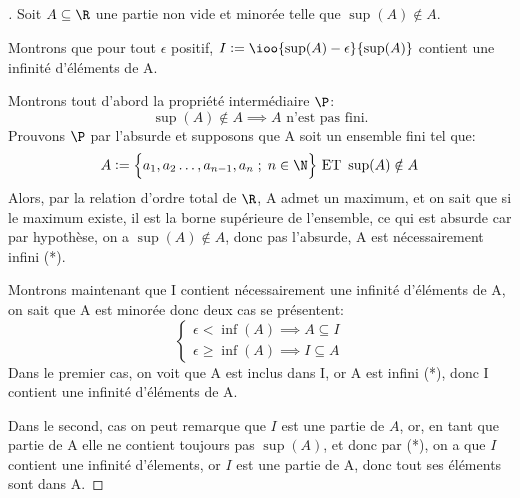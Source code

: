 \subsection[Exercice 13:]{}
\begin{proof}[\unskip\nopunct]
   Soit \(A \subseteq \R\) une partie non vide et minorée telle que \(\sup(A) \notin A\).

   Montrons que pour tout \(\epsilon\) positif, \(I := \ioo{\sup(A) - \epsilon}{\sup(A)}\) contient une infinité d'éléments de A.\<

   Montrons tout d'abord la propriété intermédiaire \(\P\):
   \[
      \sup(A) \notin A \implies A \text{ n'est pas fini.}
   \]
   Prouvons \(\P\) par l'absurde et supposons que A soit un ensemble fini tel que:
   \[
      A := \Bigl\{ a_1, a_2 \ldots, a_{n-1}, a_{n} \; ; \; n \in \N \Bigl\} \text{ ET } \sup(A) \notin A
   \]
   Alors, par la relation d'ordre total de \(\R\), A admet un maximum, et on sait que si le maximum existe, il est la borne supérieure de l'ensemble, ce qui est absurde car par hypothèse, on a \(\sup(A) \notin A\), donc pas l'absurde, A est nécessairement infini (*).\<

   Montrons maintenant que I contient nécessairement une infinité d'éléments de A, on sait que A est minorée donc deux cas se présentent:
   \[
      \begin{cases}
         \epsilon < \inf(A) \implies A \subseteq I\\
         \epsilon \geq \inf(A) \implies I \subseteq A
      \end{cases}
   \]
   Dans le premier cas, on voit que A est inclus dans I, or A est infini (*), donc I contient une infinité d'éléments de A.

   Dans le second, cas on peut remarque que \(I\) est une partie de \(A\), or, en tant que partie de A elle ne contient toujours pas \(\sup(A)\), et donc par (*), on a que \(I\) contient une infinité d'élements, or \(I\) est une partie de A, donc tout ses éléments sont dans A.
\end{proof}
\pagebreak



